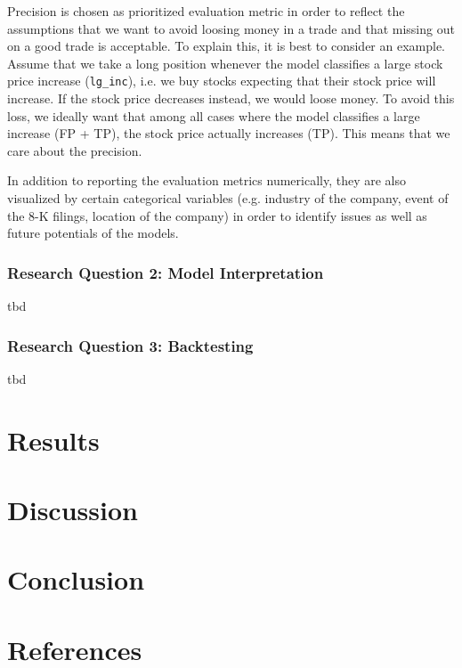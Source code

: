 \documentclass{article}
\begin{document}
	Precision is chosen as prioritized evaluation metric in order to reflect the assumptions that we want to avoid loosing money in a trade and that missing out on a good trade is acceptable. To explain this, it is best to consider an example. Assume that we take a long position whenever the model classifies a large stock price increase (\verb|lg_inc|), i.e. we buy stocks expecting that their stock price will increase. If the stock price decreases instead, we would loose money. To avoid this loss, we ideally want that among all cases where the model classifies a large increase (FP + TP), the stock price actually increases (TP). This means that we care about the precision. 
	
	In addition to reporting the evaluation metrics numerically, they are also visualized by certain categorical variables (e.g. industry of the company, event of the 8-K filings, location of the company) in order to identify issues as well as future potentials of the models. 
	
	\subsubsection{Research Question 2: Model Interpretation}
	
	tbd
	
	\subsubsection{Research Question 3: Backtesting}
	
	tbd
	
	\section{Results}

	\section{Discussion}
	
	\section{Conclusion}
	
	\section{References}
	
\printbibliography
\end{document}
